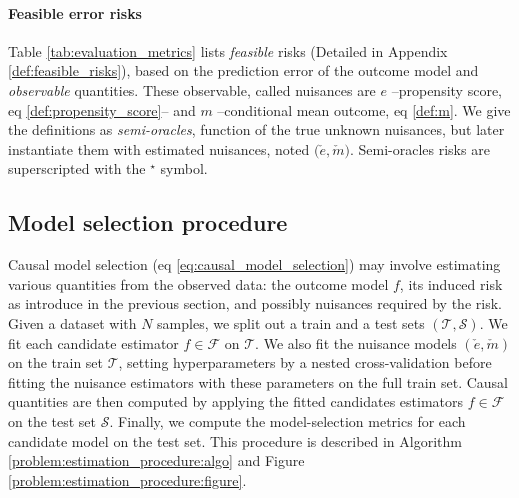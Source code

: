 \documentclass[a4paper,num-refs]{oup-contemporary}%
\begin{document}
\paragraph{Feasible error risks}\label{paragraph:feasible_metrics} Table
\ref{tab:evaluation_metrics} lists \emph{feasible} risks (Detailed in Appendix
\ref{def:feasible_risks}), based on the prediction error of the outcome model
and \emph{observable} quantities. These observable, called nuisances are $e$
--propensity score, eq \ref{def:propensity_score}-- and $m$ --conditional mean
outcome, eq \ref{def:m}. We give the definitions as \textit{semi-oracles},
function of the true unknown nuisances, but later instantiate them with
estimated nuisances, noted $\big(\check e, \check m \big)$. Semi-oracles risks
are superscripted with the $^{\star}$ symbol.

\subsection{Model selection procedure}\label{problem:estimation_procedure}

Causal model selection (eq
\ref{eq:causal_model_selection}) may involve estimating various quantities
from the observed data: the outcome model $f$, its induced risk as
introduce in the previous section, and possibly nuisances required by the
risk.
Given a dataset with $N$ samples, we split out a train and a test sets
$(\mathcal{T}, \mathcal{S})$. We
fit each candidate estimator $f \in \mathcal{F}$ on $\mathcal{T}$. We also fit
the nuisance models $(\check e, \check m)$ on the train set
$\mathcal{T}$, setting hyperparameters by a nested
cross-validation before fitting the nuisance estimators with these parameters
on the full train set. Causal quantities are then computed by applying the fitted  candidates
estimators $f \in \mathcal{F}$ on the test set $\mathcal{S}$. Finally, we
compute the model-selection metrics for
each candidate model on the test set. This procedure is described in Algorithm
\ref{problem:estimation_procedure:algo} and Figure
\ref{problem:estimation_procedure:figure}.

\end{document}
